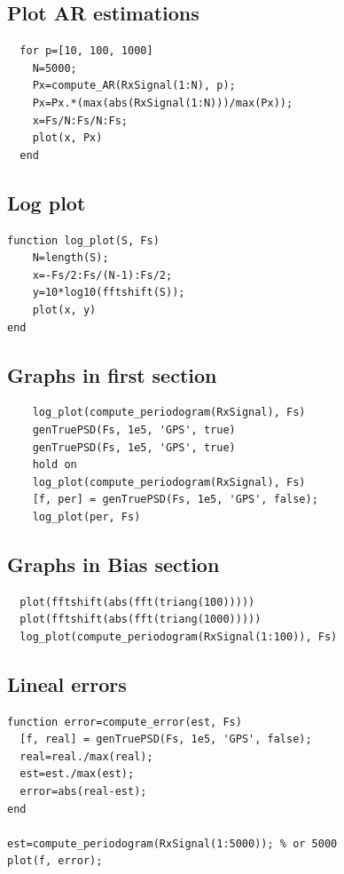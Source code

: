 \documentclass[conference,9pt]{IEEEtran}
\begin{document}
\subsection{Plot AR estimations}
\begin{verbatim}
  for p=[10, 100, 1000]
    N=5000;
    Px=compute_AR(RxSignal(1:N), p);
    Px=Px.*(max(abs(RxSignal(1:N)))/max(Px));
    x=Fs/N:Fs/N:Fs;
    plot(x, Px)
  end
\end{verbatim}

\subsection{Log plot}
\begin{verbatim}
function log_plot(S, Fs)
    N=length(S);
    x=-Fs/2:Fs/(N-1):Fs/2;
    y=10*log10(fftshift(S));
    plot(x, y)
end
\end{verbatim}

\subsection{Graphs in first section}
\begin{verbatim}
    log_plot(compute_periodogram(RxSignal), Fs)
    genTruePSD(Fs, 1e5, 'GPS', true)
    genTruePSD(Fs, 1e5, 'GPS', true)
    hold on
    log_plot(compute_periodogram(RxSignal), Fs)
    [f, per] = genTruePSD(Fs, 1e5, 'GPS', false);
    log_plot(per, Fs)
\end{verbatim}

\subsection{Graphs in Bias section}
\begin{verbatim}
  plot(fftshift(abs(fft(triang(100)))))
  plot(fftshift(abs(fft(triang(1000)))))
  log_plot(compute_periodogram(RxSignal(1:100)), Fs)
\end{verbatim}

\subsection{Lineal errors}
\begin{verbatim}
function error=compute_error(est, Fs)
  [f, real] = genTruePSD(Fs, 1e5, 'GPS', false);
  real=real./max(real);
  est=est./max(est);
  error=abs(real-est);
end

est=compute_periodogram(RxSignal(1:5000)); % or 5000
plot(f, error);
\end{verbatim}
\end{document}
